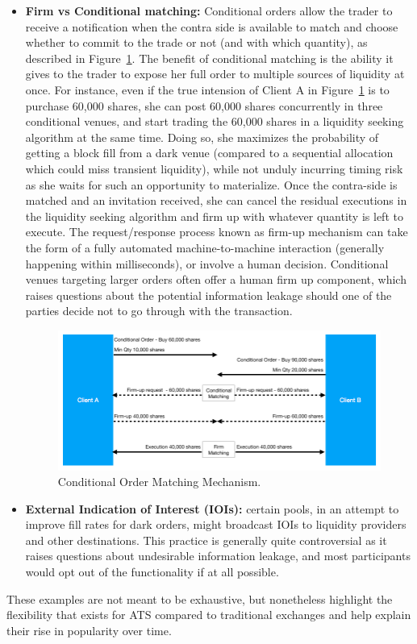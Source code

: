 \begin{itemize}
\item{\textbf{Firm vs Conditional matching:}} Conditional orders allow the trader to receive a notification when the contra side is available to match and choose whether to commit to the trade or not (and with which quantity), as described in Figure~\ref{fig:CondFlowChart2}. The benefit of conditional matching is the ability it gives to the trader to expose her full order to multiple sources of liquidity at once. For instance, even if the true intension of Client A in Figure~\ref{fig:CondFlowChart2} is to purchase 60,000 shares, she can post 60,000 shares concurrently in three conditional venues, and start trading the 60,000 shares in a liquidity seeking algorithm at the same time. Doing so, she maximizes the probability of getting a block fill from a dark venue (compared to a sequential allocation which could miss transient liquidity), while not unduly incurring timing risk as she waits for such an opportunity to materialize. Once the contra-side is matched and an invitation received, she can cancel the residual executions in the liquidity seeking algorithm and firm up with whatever quantity is left to execute.
The request/response process known as firm-up mechanism can take the form of a fully automated machine-to-machine interaction (generally happening within milliseconds), or involve a human decision. Conditional venues targeting larger orders often offer a human firm up component, which raises questions about the potential information leakage should one of the parties decide not to go through with the transaction. 

	\begin{figure}[!ht]
	\centering
	\includegraphics[width=\textwidth]{chapters/chapter_tech/figures/CondFlowChart2.png} 
	\caption{Conditional Order Matching Mechanism. \label{fig:CondFlowChart2}}
	\end{figure}

\item{\textbf{External Indication of Interest (IOIs):}} certain pools, in an attempt to improve fill rates for dark orders, might broadcast IOIs to liquidity providers and other destinations. This practice is generally quite controversial as it raises questions about undesirable information leakage, and most participants would opt out of the functionality if at all possible.
\end{itemize}


These examples are not meant to be exhaustive, but nonetheless highlight the flexibility that exists for ATS compared to traditional exchanges and help explain their rise in popularity over time.